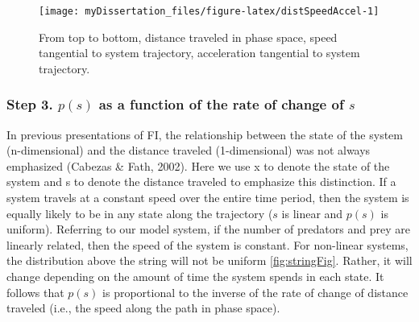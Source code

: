 \documentclass[12pt,twoside]{reedthesis}
\begin{document}
\begin{figure}

{\centering \texttt{[image: myDissertation\_files/figure-latex/distSpeedAccel-1]} 

}

\caption{From top to bottom, distance traveled in phase space, speed tangential to system trajectory, acceleration tangential to system trajectory.}\label{fig:distSpeedAccel}
\end{figure}
\hypertarget{step-3.-ps-as-a-function-of-the-rate-of-change-of-s}{%
\subsubsection{\texorpdfstring{\textbf{Step 3.} \(p(s)\) as a function of the rate of change of \(s\)}{Step 3. p(s) as a function of the rate of change of s}}\label{step-3.-ps-as-a-function-of-the-rate-of-change-of-s}}

In previous presentations of FI, the relationship between the state of the system (n-dimensional) and the distance traveled (1-dimensional) was not always emphasized (Cabezas \& Fath, 2002). Here we use x to denote the state of the system and s to denote the distance traveled to emphasize this distinction. If a system travels at a constant speed over the entire time period, then the system is equally likely to be in any state along the trajectory (\(s\) is linear and \(p(s)\) is uniform). Referring to our model system, if the number of predators and prey are linearly related, then the speed of the system is constant. For non-linear systems, the distribution above the string will not be uniform \ref{fig:stringFig}. Rather, it will change depending on the amount of time the system spends in each state. It follows that \(p(s)\) is proportional to the inverse of the rate of change of distance traveled (i.e., the speed along the path in phase space).
\end{document}

